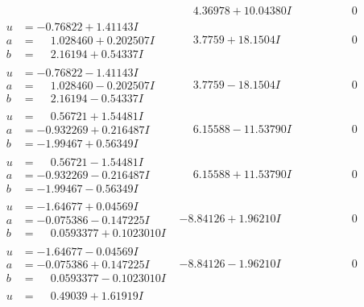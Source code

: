 \documentclass[1p]{elsarticle_modified}
\theoremstyle{definition}
\begin{document}
$$\begin{array}{c|c|c}
 & \phantom{-}4.36978 + 10.04380 I & \phantom{-0.000000 } 0 \\ \hline\begin{aligned}
u &= -0.76822 + 1.41143 I \\
a &= \phantom{-}1.028460 + 0.202507 I \\
b &= \phantom{-}2.16194 + 0.54337 I\end{aligned}
 & \phantom{-}3.7759 + 18.1504 I & \phantom{-0.000000 } 0 \\ \hline\begin{aligned}
u &= -0.76822 - 1.41143 I \\
a &= \phantom{-}1.028460 - 0.202507 I \\
b &= \phantom{-}2.16194 - 0.54337 I\end{aligned}
 & \phantom{-}3.7759 - 18.1504 I & \phantom{-0.000000 } 0 \\ \hline\begin{aligned}
u &= \phantom{-}0.56721 + 1.54481 I \\
a &= -0.932269 + 0.216487 I \\
b &= -1.99467 + 0.56349 I\end{aligned}
 & \phantom{-}6.15588 - 11.53790 I & \phantom{-0.000000 } 0 \\ \hline\begin{aligned}
u &= \phantom{-}0.56721 - 1.54481 I \\
a &= -0.932269 - 0.216487 I \\
b &= -1.99467 - 0.56349 I\end{aligned}
 & \phantom{-}6.15588 + 11.53790 I & \phantom{-0.000000 } 0 \\ \hline\begin{aligned}
u &= -1.64677 + 0.04569 I \\
a &= -0.075386 - 0.147225 I \\
b &= \phantom{-}0.0593377 + 0.1023010 I\end{aligned}
 & -8.84126 + 1.96210 I & \phantom{-0.000000 } 0 \\ \hline\begin{aligned}
u &= -1.64677 - 0.04569 I \\
a &= -0.075386 + 0.147225 I \\
b &= \phantom{-}0.0593377 - 0.1023010 I\end{aligned}
 & -8.84126 - 1.96210 I & \phantom{-0.000000 } 0 \\ \hline\begin{aligned}
u &= \phantom{-}0.49039 + 1.61919 I \\

\end{aligned}
\end{array}$$
\end{document}
